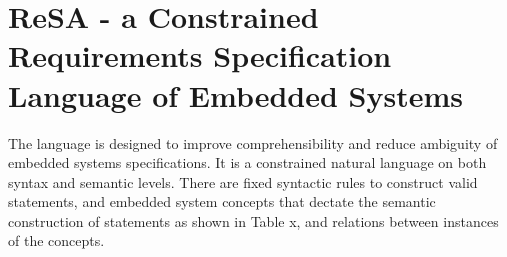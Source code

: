\section{ReSA - a Constrained Requirements Specification Language of Embedded Systems}
The language is designed to improve comprehensibility and reduce ambiguity of embedded systems specifications. It is a constrained natural language on both syntax and semantic levels. There are fixed syntactic rules to construct valid statements, and embedded system concepts that dectate the semantic construction of statements as shown in Table x, and relations between instances of the concepts.

